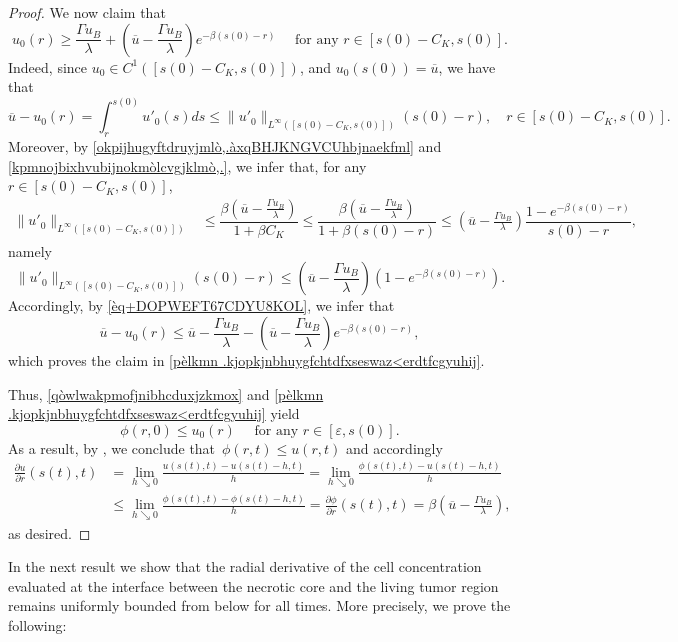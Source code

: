 \documentclass[12pt,a4paper,intlimits,sumlimits]{amsart}
\theoremstyle{definition}
\theoremstyle{plain}
\numberwithin{equation}{section}
\renewcommand{\le}{\leqslant}
\renewcommand{\ge}{\geqslant}
\begin{document}
\begin{proof}
We now claim that
\begin{equation}\label{pèlkmn .kjopkjnbhuygfchtdfxseswaz<erdtfcgyuhij}
u_0(r)\ge \frac{\Gamma u_B}{\lambda}+\left(\overline u -\frac{\Gamma u_B}{\lambda}\right)e^{-\beta(s(0)-r)}\quad\mbox{ for any } r\in [s(0)- C_K, s(0)].
\end{equation}
Indeed, since $u_0\in C^1([s(0)-C_K, s(0)])$,  and $u_0(s(0))=\overline u$, we have that
\begin{equation}\label{èq+DOPWEFT67CDYU8KOL}
\overline u - u_0(r)=\int_r^{s(0)} u'_0(s) ds \le \|u'_0\|_{L^\infty([s(0)-C_K, s(0)])} (s(0)-r),  \quad r\in [s(0)-C_K, s(0)].
\end{equation}
Moreover, by \eqref{okpijhugyftdruyjmlò,.àxqBHJKNGVCUhbjnaekfml} and \eqref{kpmnojbixhvubijnokmòlcvgjklmò,.},  we infer that, for any $r\in [s(0)- C_K, s(0)]$, 
\[
\begin{split}
\|u'_0\|_{L^\infty([s(0)- C_K, s(0)])}&\le\dfrac{\beta\left(\overline u-\frac{\Gamma u_B}{\lambda}\right)}{1+\beta C_K }\le\dfrac{\beta\left(\overline u-\frac{\Gamma u_B}{\lambda}\right)}{1+\beta (s(0)-r)}\le\left(\overline u-\frac{\Gamma u_B}{\lambda}\right)\dfrac{1-e^{-\beta(s(0)-r)}}{s(0)-r},
\end{split}
\]
namely
\[
\|u'_0\|_{L^\infty([s(0)-C_K, s(0)])}(s(0)-r)\le\left(\overline u-\frac{\Gamma u_B}{\lambda}\right) (1-e^{-\beta(s(0)-r)}).
\]
Accordingly, by \eqref{èq+DOPWEFT67CDYU8KOL}, we infer that
\[
\overline u - u_0(r)\le \overline u-\frac{\Gamma u_B}{\lambda} -\left(\overline u-\frac{\Gamma u_B}{\lambda}\right)e^{-\beta(s(0)-r)}, 
\]
which proves the claim in \eqref{pèlkmn .kjopkjnbhuygfchtdfxseswaz<erdtfcgyuhij}.

Thus,  \eqref{qòwlwakpmofjnibhcduxjzkmox} and \eqref{pèlkmn .kjopkjnbhuygfchtdfxseswaz<erdtfcgyuhij} yield
\[
\phi(r, 0)\le u_0(r) \quad\mbox{ for any } r\in[\varepsilon, s(0)].
\]
As a result, by \cite[Corollary~2.5]{MR1465184},
we conclude that~$\phi(r, t)\le u(r,t)$ and accordingly
\[
\begin{split}
\frac{\partial u}{\partial r}(s(t),t)&=\lim_{h\searrow0}\frac{u(s(t),t)-u(s(t)-h,t)}{h}=\lim_{h\searrow0}\frac{\phi(s(t),t)-u(s(t)-h,t)}{h}\\
&\le\lim_{h\searrow0}\frac{\phi(s(t),t)-\phi(s(t)-h,t)}{h}=
\frac{\partial \phi}{\partial r}(s(t),t)= \beta\left(\overline u -\frac{\Gamma u_B}{\lambda}\right),
\end{split}
\]
as desired.
\end{proof}

In the next result we show that the radial derivative of the cell concentration evaluated at the interface between the necrotic core and the living tumor region remains uniformly bounded from below for all times.
More precisely,  we prove the following:
\end{document}

